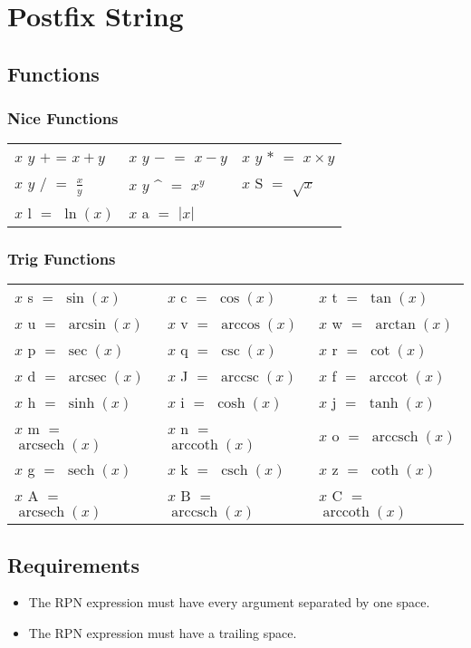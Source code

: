 \documentclass{article}
\DeclareMathOperator{\arcsec}{arcsec}
\DeclareMathOperator{\arccot}{arccot}
\DeclareMathOperator{\arccsc}{arccsc}
\DeclareMathOperator{\arcsech}{arcsech}
\DeclareMathOperator{\arccoth}{arccoth}
\DeclareMathOperator{\arccsch}{arccsch}
\DeclareMathOperator{\arcsinh}{arcsech}
\DeclareMathOperator{\arccosh}{arccoth}
\DeclareMathOperator{\arctanh}{arccsch}
\DeclareMathOperator{\sech}{sech}
\DeclareMathOperator{\csch}{csch}
\begin{document}
\section{Postfix String}
\subsection{Functions}
{\doublespacing
\subsubsection{Nice Functions}
\begin{tabular}{lll}
$x$ $y$ $+$ = $x + y$ & $x$ $y$ $-$ $=$ $x - y$ & $x$ $y$ $*$ $=$ $x \times y$\\
$x$ $y$ $/$ $=$ $\frac{x}{y}$&$x$ $y$ \^{} $=$ $x^y$&$x$ S $=$ $\sqrt{x}$\\
$x$ l $=$ $\ln(x)$& $x$ a $=$ $|x|$&\\
\end{tabular}
\subsubsection{Trig Functions}
\begin{tabular}{lll}
$x$ s $=$ $\sin(x)$&$x$ c $=$ $\cos(x)$& $x$ t $=$ $\tan(x)$\\
$x$ u $=$ $\arcsin(x)$&$x$ v $=$ $\arccos(x)$& $x$ w $=$ $\arctan(x)$\\
$x$ p $=$ $\sec(x)$&$x$ q $=$ $\csc(x)$& $x$ r $=$ $\cot(x)$\\
$x$ d $=$ $\arcsec(x)$&$x$ J $=$ $\arccsc(x)$& $x$ f $=$ $\arccot(x)$\\
$x$ h $=$ $\sinh(x)$&$x$ i $=$ $\cosh(x)$& $x$ j $=$ $\tanh(x)$\\
$x$ m $=$ $\arcsinh(x)$&$x$ n $=$ $\arccosh(x)$& $x$ o $=$ $\arctanh(x)$\\
$x$ g $=$ $\sech(x)$&$x$ k $=$ $\csch(x)$& $x$ z $=$ $\coth(x)$\\
$x$ A $=$ $\arcsech(x)$&$x$ B $=$ $\arccsch(x)$& $x$ C $=$ $\arccoth(x)$\\
\end{tabular}
}\subsection{Requirements}{
\begin{itemize}
\item{The RPN expression must have every argument separated by one space.}
\item{The RPN expression must have a trailing space.}
\end{itemize}
}
\end{document}
